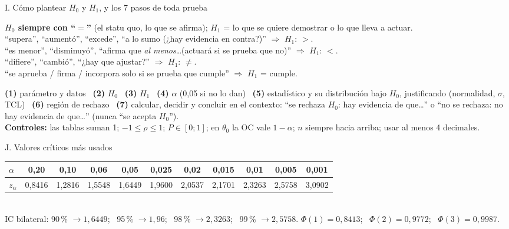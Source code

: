 \documentclass[10pt,a4paper]{extarticle}
\begin{document}
\begin{hoja}{I. Cómo plantear $H_0$ y $H_1$, y los 7 pasos de toda prueba}
\begin{multicols}{2}\raggedright
\textbf{$H_0$ siempre con ``$=$''} (el statu quo, lo que se afirma); \textbf{$H_1$} = lo que se quiere demostrar o lo que lleva a actuar.\\
``supera'', ``aumentó'', ``excede'', ``a lo sumo (¿hay evidencia en contra?)'' $\Rightarrow$ $H_1{:}\,>$.\\
``es menor'', ``disminuyó'', ``afirma que \emph{al menos}\ldots (actuará si se prueba que no)'' $\Rightarrow$ $H_1{:}\,<$.\\
``difiere'', ``cambió'', ``¿hay que ajustar?'' $\Rightarrow$ $H_1{:}\,\ne$.\\
``se aprueba / firma / incorpora solo si se prueba que cumple'' $\Rightarrow$ $H_1$ = cumple.

\columnbreak
\textbf{(1)} parámetro y datos \ \textbf{(2)} $H_0$ \ \textbf{(3)} $H_1$ \ \textbf{(4)} $\alpha$ (0,05 si no lo dan) \ \textbf{(5)} estadístico y su distribución bajo $H_0$, justificando (normalidad, $\sigma$, TCL) \ \textbf{(6)} región de rechazo \ \textbf{(7)} calcular, decidir y concluir en el contexto: ``se rechaza $H_0$: hay evidencia de que\ldots'' o ``no se rechaza: no hay evidencia de que\ldots'' (nunca ``se acepta $H_0$'').\\
\textbf{Controles:} las tablas suman 1; $-1\le\rho\le1$; $P\in[0;1]$; en $\theta_0$ la OC vale $1-\alpha$; $n$ siempre hacia arriba; usar al menos 4 decimales.
\end{multicols}
\end{hoja}

\begin{hoja}{J. Valores críticos más usados}
\renewcommand{\arraystretch}{1.25}
\begin{tabular}{@{}lcccccccccc@{}}
\toprule
$\alpha$ & 0,20 & 0,10 & 0,06 & 0,05 & 0,025 & 0,02 & 0,015 & 0,01 & 0,005 & 0,001\\\midrule
$z_\alpha$ & 0,8416 & 1,2816 & 1,5548 & 1,6449 & 1,9600 & 2,0537 & 2,1701 & 2,3263 & 2,5758 & 3,0902\\\bottomrule
\end{tabular}\\[2pt]
IC bilateral: 90\,\% $\to1{,}6449$; \ 95\,\% $\to1{,}96$; \ 98\,\% $\to2{,}3263$; \ 99\,\% $\to2{,}5758$. \quad $\Phi(1)=0{,}8413$; \ $\Phi(2)=0{,}9772$; \ $\Phi(3)=0{,}9987$.
\end{hoja}
\end{document}
